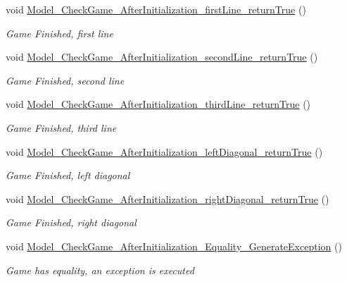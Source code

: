 \begin{DoxyCompactItemize}
void \hyperlink{class_test_morpion_1_1_test_model_a96c9d0913003f3a24709a0c76e293f24}{Model\+\_\+\+Check\+Game\+\_\+\+After\+Initialization\+\_\+first\+Line\+\_\+return\+True} ()
\begin{DoxyCompactList}\small\item\em Game Finished, first line \end{DoxyCompactList}\item 
void \hyperlink{class_test_morpion_1_1_test_model_a69b469f8cf92bbb0a401023c91419db1}{Model\+\_\+\+Check\+Game\+\_\+\+After\+Initialization\+\_\+second\+Line\+\_\+return\+True} ()
\begin{DoxyCompactList}\small\item\em Game Finished, second line \end{DoxyCompactList}\item 
void \hyperlink{class_test_morpion_1_1_test_model_ad88e8d17e46e6292bca64376a009e39d}{Model\+\_\+\+Check\+Game\+\_\+\+After\+Initialization\+\_\+third\+Line\+\_\+return\+True} ()
\begin{DoxyCompactList}\small\item\em Game Finished, third line \end{DoxyCompactList}\item 
void \hyperlink{class_test_morpion_1_1_test_model_acacf89cf1247a2071d86fbfd1b0c5f1f}{Model\+\_\+\+Check\+Game\+\_\+\+After\+Initialization\+\_\+left\+Diagonal\+\_\+return\+True} ()
\begin{DoxyCompactList}\small\item\em Game Finished, left diagonal \end{DoxyCompactList}\item 
void \hyperlink{class_test_morpion_1_1_test_model_a7cb30a35c8eb535b16403ab8e6cb33cd}{Model\+\_\+\+Check\+Game\+\_\+\+After\+Initialization\+\_\+right\+Diagonal\+\_\+return\+True} ()
\begin{DoxyCompactList}\small\item\em Game Finished, right diagonal \end{DoxyCompactList}\item 
void \hyperlink{class_test_morpion_1_1_test_model_a633a6ca57d3f0eddc5f8bdfb19aca7eb}{Model\+\_\+\+Check\+Game\+\_\+\+After\+Initialization\+\_\+\+Equality\+\_\+\+Generate\+Exception} ()
\begin{DoxyCompactList}\small\item\em Game has equality, an exception is executed \end{DoxyCompactList}\end{DoxyCompactItemize}


